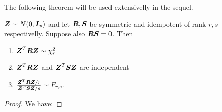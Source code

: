 The following theorem will be used extensivelly in the sequel. 
\begin{theorem}
    $\boldsymbol{Z}\sim N(0, \boldsymbol{I}_p)$ and let $\boldsymbol{R}, \boldsymbol{S}$ be symmetric and idempotent of rank $r, s$ respectivelly. Suppose also $\boldsymbol{RS}=0$. Then 
    \begin{enumerate}
        \item $\boldsymbol{Z}^T \boldsymbol{R} \boldsymbol{Z} \sim \chi^2_r$
        \item $\boldsymbol{Z}^T \boldsymbol{R} \boldsymbol{Z}$ and $\boldsymbol{Z}^T \boldsymbol{S} \boldsymbol{Z}$ are independent
        \item $\frac{\boldsymbol{Z}^T \boldsymbol{R} \boldsymbol{Z} / r}{\boldsymbol{Z}^T \boldsymbol{S} \boldsymbol{Z}/s} \sim F_{r,s}$.
    \end{enumerate}
\end{theorem}
\begin{proof} We have: 
\end{proof}